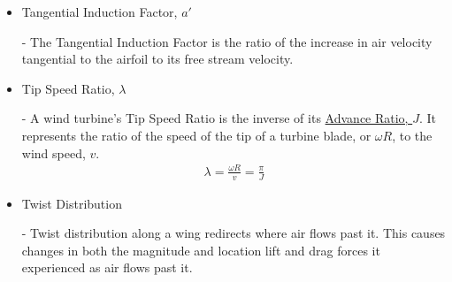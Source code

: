 \documentclass{article}
\begin{document}
\begin{itemize}
	\item \hypertarget{a'}{Tangential Induction Factor, $a'$} - The Tangential Induction Factor is the ratio of the increase in air velocity tangential to the airfoil to its free stream velocity.
	
	\item \hypertarget{lambda}{Tip Speed Ratio, $\lambda$} - A wind turbine's Tip Speed Ratio is the inverse of its \hyperlink{J}{Advance Ratio, $J$}. It represents the ratio of the speed of the tip of a turbine blade, or $\omega R$, to the wind speed, $v$.
	\begin{equation}
	\begin{aligned}
		\lambda = \frac{\omega R}{v} = \frac{\pi}{J}
	\end{aligned}
	\end{equation}
	
	\item \hypertarget{T}{Twist Distribution} - Twist distribution along a wing redirects where air flows past it. This causes changes in both the magnitude and location lift and drag forces it experienced as air flows past it.
	
\end{itemize}
\end{document}

